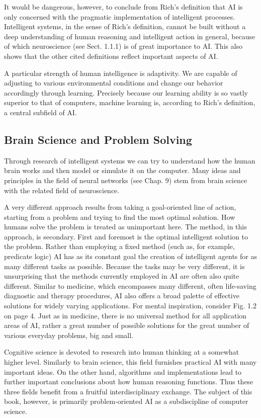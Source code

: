 \documentclass[10pt]{book}
\begin{document}
It would be dangerous, however, to conclude from Rich's definition that AI is only concerned with the pragmatic implementation of intelligent processes. Intelligent systems, in the sense of Rich's definition, cannot be built without a deep understanding of human reasoning and intelligent action in general, because of which neuroscience (see Sect. 1.1.1) is of great importance to AI. This also shows that the other cited definitions reflect important aspects of AI.

A particular strength of human intelligence is adaptivity. We are capable of adjusting to various environmental conditions and change our behavior accordingly through learning. Precisely because our learning ability is so vastly superior to that of computers, machine learning is, according to Rich's definition, a central subfield of AI.

\subsection{Brain Science and Problem Solving}
Through research of intelligent systems we can try to understand how the human brain works and then model or simulate it on the computer. Many ideas and principles in the field of neural networks (see Chap. 9) stem from brain science with the related field of neuroscience.

A very different approach results from taking a goal-oriented line of action, starting from a problem and trying to find the most optimal solution. How humans solve the problem is treated as unimportant here. The method, in this approach, is secondary. First and foremost is the optimal intelligent solution to the problem. Rather than employing a fixed method (such as, for example, predicate logic) AI has as its constant goal the creation of intelligent agents for as many different tasks as possible. Because the tasks may be very different, it is unsurprising that the methods currently employed in AI are often also quite different. Similar to medicine, which encompasses many different, often life-saving diagnostic and therapy procedures, AI also offers a broad palette of effective solutions for widely varying applications. For mental inspiration, consider Fig. 1.2 on page 4. Just as in medicine, there is no universal method for all application areas of AI, rather a great number of possible solutions for the great number of various everyday problems, big and small.

Cognitive science is devoted to research into human thinking at a somewhat higher level. Similarly to brain science, this field furnishes practical AI with many important ideas. On the other hand, algorithms and implementations lead to further important conclusions about how human reasoning functions. Thus these three fields benefit from a fruitful interdisciplinary exchange. The subject of this book, however, is primarily problem-oriented AI as a subdiscipline of computer science.
\end{document}
